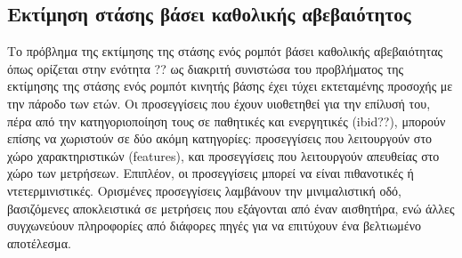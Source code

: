 \subsection{Εκτίμηση στάσης βάσει καθολικής αβεβαιότητος}
\label{subsection:02_03_02:01}

Το πρόβλημα της εκτίμησης της στάσης ενός ρομπότ βάσει καθολικής αβεβαιότητας
όπως ορίζεται στην ενότητα ?? ως διακριτή συνιστώσα του προβλήματος της
εκτίμησης της στάσης ενός ρομπότ κινητής βάσης έχει τύχει εκτεταμένης προσοχής
με την πάροδο των ετών. Οι προσεγγίσεις που έχουν υιοθετηθεί για την επίλυσή
του, πέρα από την κατηγοριοποίηση τους σε παθητικές και ενεργητικές (ibid??),
μπορούν επίσης να χωριστούν σε δύο ακόμη κατηγορίες: προσεγγίσεις που
λειτουργούν στο χώρο χαρακτηριστικών (features), και προσεγγίσεις που
λειτουργούν απευθείας στο χώρο των μετρήσεων. Επιπλέον, οι προσεγγίσεις μπορεί
να είναι πιθανοτικές ή ντετερμινιστικές. Ορισμένες προσεγγίσεις λαμβάνουν την
μινιμαλιστική οδό, βασιζόμενες αποκλειστικά σε μετρήσεις που εξάγονται από έναν
αισθητήρα, ενώ άλλες συγχωνεύουν πληροφορίες από διάφορες πηγές για να
επιτύχουν ένα βελτιωμένο αποτέλεσμα.

